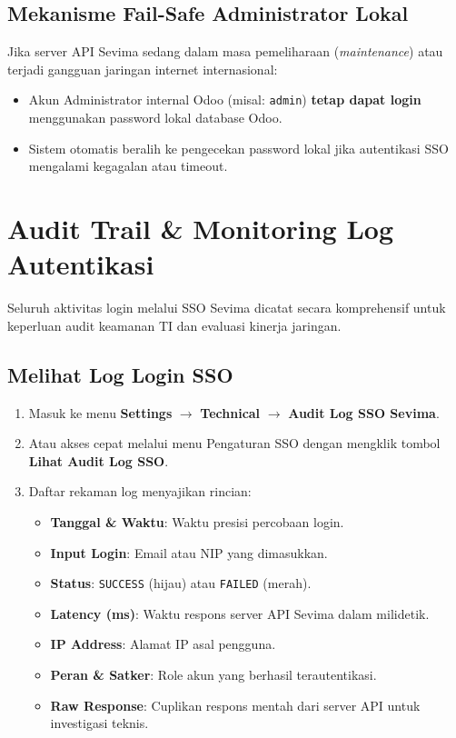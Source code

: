 \documentclass[11pt,a4paper]{article}
\begin{document}
\subsection{Mekanisme Fail-Safe Administrator Lokal}
\begin{warningbox}
Jika server API Sevima sedang dalam masa pemeliharaan (\textit{maintenance}) atau terjadi gangguan jaringan internet internasional:
\begin{itemize}
    \item Akun Administrator internal Odoo (misal: \texttt{admin}) \textbf{tetap dapat login} menggunakan password lokal database Odoo.
    \item Sistem otomatis beralih ke pengecekan password lokal jika autentikasi SSO mengalami kegagalan atau timeout.
\end{itemize}
\end{warningbox}

\newpage
\section{Audit Trail \& Monitoring Log Autentikasi}

Seluruh aktivitas login melalui SSO Sevima dicatat secara komprehensif untuk keperluan audit keamanan TI dan evaluasi kinerja jaringan.

\subsection{Melihat Log Login SSO}
\begin{enumerate}
    \item Masuk ke menu \textbf{Settings} $\rightarrow$ \textbf{Technical} $\rightarrow$ \textbf{Audit Log SSO Sevima}.
    \item Atau akses cepat melalui menu Pengaturan SSO dengan mengklik tombol \textbf{Lihat Audit Log SSO}.
    \item Daftar rekaman log menyajikan rincian:
    \begin{itemize}
        \item \textbf{Tanggal \& Waktu}: Waktu presisi percobaan login.
        \item \textbf{Input Login}: Email atau NIP yang dimasukkan.
        \item \textbf{Status}: \texttt{SUCCESS} (hijau) atau \texttt{FAILED} (merah).
        \item \textbf{Latency (ms)}: Waktu respons server API Sevima dalam milidetik.
        \item \textbf{IP Address}: Alamat IP asal pengguna.
        \item \textbf{Peran \& Satker}: Role akun yang berhasil terautentikasi.
        \item \textbf{Raw Response}: Cuplikan respons mentah dari server API untuk investigasi teknis.
    \end{itemize}
\end{enumerate}
\end{document}
